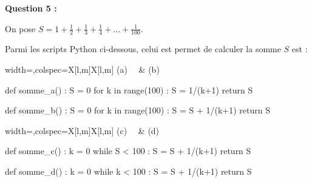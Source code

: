 \textbf{Question 5 :}

\medskip

On pose $S=1+\frac12+\frac13+\frac14+\ldots+\frac{1}{100}$.

\smallskip

Parmi les scripts \textsf{Python} ci-dessous, celui est permet de calculer la somme $S$ est :

\begin{tblr}{width=\linewidth,colspec={X[l,m]X[l,m]}}
	(a)~~ & (b)~~
\end{tblr}

\begin{minipage}{0.5\linewidth}
\begin{CodePythonLstAlt}[Largeur=8cm]{}
def somme_a() :
	S = 0
	for k in range(100) :
		S = 1/(k+1)
	return S
\end{CodePythonLstAlt}
\end{minipage}
\begin{minipage}{0.5\linewidth}
\begin{CodePythonLstAlt}[Largeur=8cm]{}
def somme_b() :
	S = 0
	for k in range(100) :
		S = S + 1/(k+1)
	return S
\end{CodePythonLstAlt}
\end{minipage}

\begin{tblr}{width=\linewidth,colspec={X[l,m]X[l,m]}}
	(c)~~ & (d)~~
\end{tblr}

\begin{minipage}{0.5\linewidth}
\begin{CodePythonLstAlt}[Largeur=8cm]{}
def somme_c() :
	k = 0
	while S < 100 :
		S = S + 1/(k+1)
	return S
\end{CodePythonLstAlt}
\end{minipage}
\begin{minipage}{0.5\linewidth}
\begin{CodePythonLstAlt}[Largeur=8cm]{}
def somme_d() :
	k = 0
	while k < 100 :
		S = S + 1/(k+1)
	return S
\end{CodePythonLstAlt}
\end{minipage}
